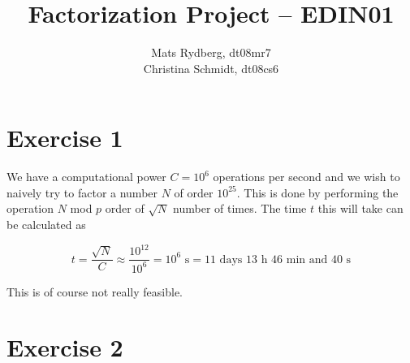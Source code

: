 \documentclass[a4paper,titlepage]{article}
\title{Factorization Project -- EDIN01}
\author{    Mats Rydberg, dt08mr7       \\
            Christina Schmidt, dt08cs6
  }
\begin{document}
\maketitle
\section*{Exercise 1}
We have a computational power $C = 10^6$ operations per second and we wish to naively try to factor a number $N$ of order $10^{25}$. This is done by performing the operation $N$ mod $p$ order of $\sqrt{N}$ number of times. The time $t$ this will take can be calculated as

$$
t = \frac{\sqrt{N}}{C} \approx \frac{10^{12}}{10^6} = 10^6 \text{ s} = 11 \text{ days } 13 \text{ h } 46 \text{ min and  } 40 \text{ s}
$$

This is of course not really feasible.

\section*{Exercise 2}
\end{document}
